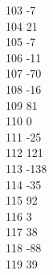 { 103	-7 \\
 104	21 \\
 105	-7 \\
 106	-11 \\
 107	-70 \\
 108	-16 \\
 109	81 \\
 110	0 \\
 111	-25 \\
 112	121 \\
 113	-138 \\
 114	-35 \\
 115	92 \\
 116	3 \\
 117	38 \\
 118	-88 \\
 119	39 \\
}

